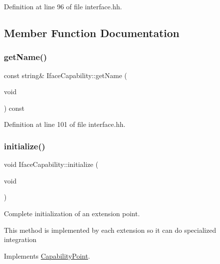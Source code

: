 Definition at line 96 of file interface.\+hh.



\subsection{Member Function Documentation}
\mbox{\label{class_iface_capability_aee5adb75cdcd38edb6db0fcf86cba3af}} 
\subsubsection{\texorpdfstring{getName()}{getName()}}
{\footnotesize\ttfamily const string\& Iface\+Capability\+::get\+Name (\begin{DoxyParamCaption}\item[{void}]{ }\end{DoxyParamCaption}) const\hspace{0.3cm}{\ttfamily [inline]}}



Definition at line 101 of file interface.\+hh.

\mbox{\label{class_iface_capability_a65449e5d8ca98ab3febfa3dd23f451a4}} 
\subsubsection{\texorpdfstring{initialize()}{initialize()}}
{\footnotesize\ttfamily void Iface\+Capability\+::initialize (\begin{DoxyParamCaption}\item[{void}]{ }\end{DoxyParamCaption})\hspace{0.3cm}{\ttfamily [virtual]}}



Complete initialization of an extension point. 

This method is implemented by each extension so it can do specialized integration 

Implements \mbox{\hyperlink{class_capability_point_a493d24125e7e024a9b2d6c2ad4bfbfab}{Capability\+Point}}.



